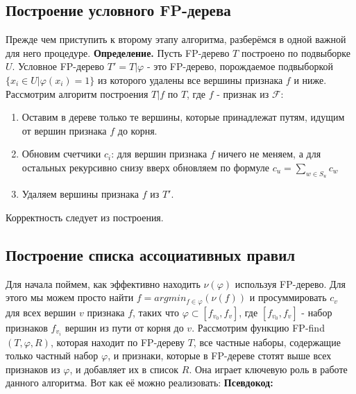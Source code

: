 \subsection{Построение условного FP-дерева}

Прежде чем приступить к второму этапу алгоритма, разберёмся в одной важной для него процедуре.
\newline\newline
\textbf{Определение.} Пусть FP-дерево $T$ построено по подвыборке $U$. Условное FP-дерево $T' = T|\varphi$ - это FP-дерево, порождаемое подвыборкой $\{x_i \in U| \varphi(x_i) = 1 \}$ из которого удалены все вершины признака $f$ и ниже.
\newline\newline
Рассмотрим алгоритм построения $T|f$ по $T$, где $f$ - признак из $\mathcal{F}$:
\begin{enumerate}
    \item Оставим в дереве только те вершины, которые принадлежат путям, идущим от вершин признака $f$ до корня.
    \item Обновим счетчики $c_i$: для вершин признака $f$ ничего не меняем, а для остальных рекурсивно снизу вверх обновляем по формуле $c_u = \displaystyle\sum_{w \in S_u} c_w$
    \item Удаляем вершины признака $f$ из $T'$.
\end{enumerate}

Корректность следует из построения.

\subsection{Построение списка ассоциативных правил}

Для начала поймем, как эффективно находить $\nu(\varphi)$ используя FP-дерево. Для этого мы можем просто найти $f =argmin_{f \in \varphi} (\nu(f))$ и просуммировать $c_v$ для всех вершин $v$ признака $f$, таких что $\varphi \subset [f_{v_0}, f_{v}]$, где $[f_{v_0}, f_{v}]$ - набор признаков $f_{v_i}$ вершин из пути от корня до $v$.
\newline\newline
Рассмотрим функцию FP-find$(T,\varphi,R)$, которая находит по FP-дереву $T$, все частные наборы, содержащие только частный набор $\varphi$, и признаки, которые в FP-дереве стотят выше всех признаков из $\varphi$, и добавляет их в список $R$. Она играет ключевую роль в работе данного алгоритма. Вот как её можно реализовать:
\newline\newline
\textbf{Псевдокод:}

